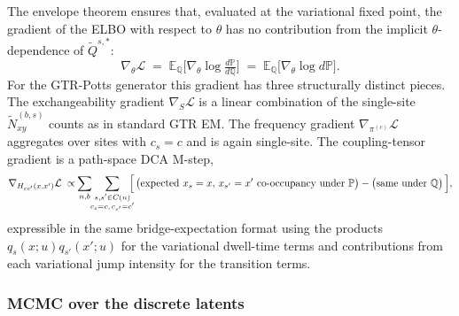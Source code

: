 The envelope theorem ensures that, evaluated at the variational
fixed point, the gradient of the ELBO with respect to $\theta$ has
no contribution from the implicit $\theta$-dependence of
$\tilde Q^{s,*}$:
\[
\nabla_\theta \mathcal{L}
\;=\; \mathbb{E}_\mathbb{Q}\!\bigl[\nabla_\theta \log \tfrac{d\mathbb{P}}{d\mathbb{Q}}\bigr]
\;=\; \mathbb{E}_\mathbb{Q}\!\bigl[\nabla_\theta \log d\mathbb{P}\bigr].
\]
For the GTR-Potts generator this gradient has three structurally
distinct pieces. The exchangeability gradient $\nabla_S \mathcal{L}$
is a linear combination of the single-site $\tilde N^{(b,s)}_{xy}$
counts as in standard GTR EM. The frequency gradient
$\nabla_{\pi^{(c)}} \mathcal{L}$ aggregates over sites with
$c_s = c$ and is again single-site. The coupling-tensor gradient is
a path-space DCA M-step,
\[
\nabla_{H_{cc'}(x, x')} \mathcal{L}
\;\propto\; \!\!\sum_{n, b}\!\!\sum_{\substack{s, s' \in C(n) \\ c_s = c,\, c_{s'} = c'}}\!\!\!\Bigl[\,\bigl(\text{expected } x_s = x,\, x_{s'} = x' \text{ co-occupancy under } \mathbb{P}\bigr) - \bigl(\text{same under } \mathbb{Q}\bigr)\,\Bigr],
\]
expressible in the same bridge-expectation format using the products
$q_s(x; u) q_{s'}(x'; u)$ for the variational dwell-time terms and
contributions from each variational jump intensity for the
transition terms.

\subsubsection*{MCMC over the discrete latents}

